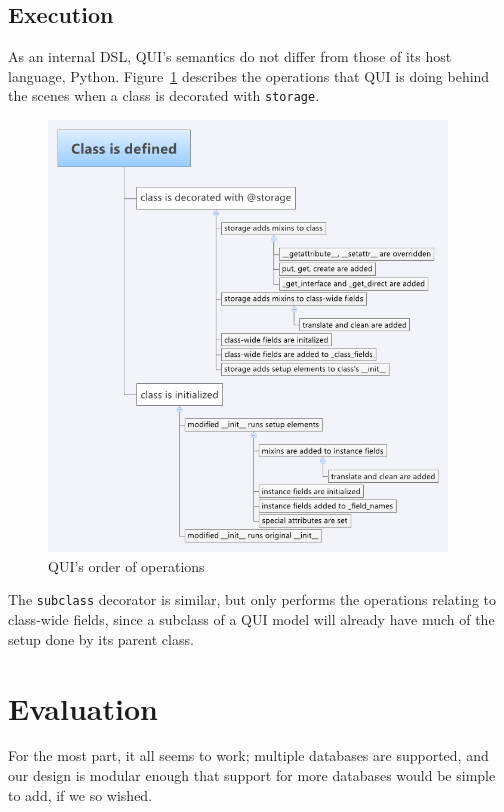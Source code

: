 \documentclass{article} %
\newcommand{\il}[1]{\mbox{\lstinline{#1}}}
\begin{document}
\subsection{Execution}
As an internal DSL, QUI's semantics do not differ from those of its host language, Python. Figure~\ref{fig:classdef} describes the operations that QUI is doing behind the scenes when
a class is decorated with \il{storage}.
\begin{figure}[htb]
\centering
\includegraphics[width=400px]{ClassDefTimeline}
\caption{QUI's order of operations}
\label{fig:classdef}
\end{figure}

The \il{subclass} decorator is similar, but only performs the operations relating to class-wide fields, since a subclass of a QUI model will already have much of the setup done by its parent class. 

\section{Evaluation}
For the most part, it all seems to work; multiple databases are supported, and our design is modular enough that support for more databases would be simple to add, if we so wished. 
\end{document}
